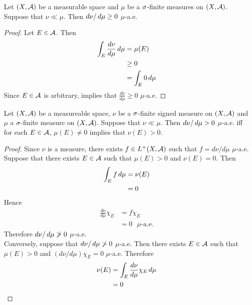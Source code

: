 \documentclass{book}
\begin{document}
	\begin{ex}
		Let $(X, \mathcal{A})$ be a measurable space and $\mu$ be a $\sigma$-finite measures on $(X, \mathcal{A})$. Suppose that $\nu \ll \mu$. Then $d\nu / \, d \mu \geq 0$ $\mu$-a.e.
	\end{ex}

	\begin{proof}
		Let $E \in \mathcal{A}$. Then 
		\begin{align*}
			\int_E \frac{d \nu}{d \mu} \, d \mu 
			& = \mu(E) \\
			& \geq 0 \\
			& = \int_E 0 \, d \mu 
		\end{align*}
		Since $E \in \mathcal{A}$ is arbitrary,   implies that $\frac{d \nu}{d \mu} \geq 0$ $\mu$-a.e.
	\end{proof}
	
	\begin{ex}
		Let $(X, \mathcal{A})$ be a measureable space, $\nu$ be a $\sigma$-finite signed measure on $(X, \mathcal{A})$ and $\mu$ a $\sigma$-finite measure on $(X,\mathcal{A})$. Suppose that $\nu \ll \mu$. Then $d\nu / \, d \mu > 0$ $\mu$-a.e. iff for each $E \in \mathcal{A}$, $\mu(E) \neq 0$ implies that $\nu(E) > 0$. 
	\end{ex}

	\begin{proof}
		Since $\nu$ is a measure, there exists $f \in L^+(X, \mathcal{A})$ such that $f = d\nu/ d\mu$ $\mu$-a.e. Suppose that there exists $E \in \mathcal{A}$ such that $\mu(E) > 0$ and $\nu(E) = 0$. Then 
		\begin{align*}
			\int_E f \, d \mu  
			& = \nu(E) \\
			& = 0 
		\end{align*}
		Hence 
		\begin{align*}
			\frac{d \nu}{d\mu}\chi_E 
			& = f \chi_E \\
			& = 0 \text{ $\mu$-a.e.}
		\end{align*} 
		Therefore $d\nu / \, d \mu \not > 0$ $\mu$-a.e.\\
		Conversely, suppose that $d\nu / \, d \mu \not > 0$ $\mu$-a.e. Then there exists $E \in \mathcal{A}$ such that $\mu(E) > 0$ and $(d \nu / d\mu)\chi_E = 0$ $\mu$-a.e. Therefore 
		\begin{align*}
			\nu(E)
			& = \int_E \frac{d \nu}{d\mu}\chi_E  \, d \mu \\
			& = 0
		\end{align*}
	\end{proof}

	
	
\end{document}
